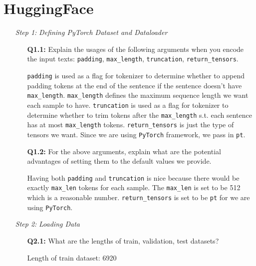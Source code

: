 \documentclass{article}
\newenvironment{solution}{\color{blue}}{}
\begin{document}
\section{HuggingFace}
\begin{itemize}
  \item[\textit{Step 1:}] \textit{Defining PyTorch Dataset and Dataloader}
  
  \begin{itemize}
    \item[\textbf{Q1.1:}] Explain the usages of the following arguments when you encode the input texts: \texttt{padding}, \texttt{max\_length}, \texttt{truncation}, \texttt{return\_tensors}.
    
    \begin{solution}
      \texttt{padding} is used as a flag for tokenizer to determine whether to append padding tokens at the end of the sentence if the sentence doesn't have \texttt{max\_length}. \texttt{max\_length} defines the maximum sequence length we want each sample to have. \texttt{truncation} is used as a flag for tokenizer to determine whether to trim tokens after the \texttt{max\_length} s.t. each sentence has at most \texttt{max\_length} tokens. \texttt{return\_tensors} is just the type of tensors we want. Since we are using \texttt{PyTorch} framework, we pass in \texttt{pt}.
    \end{solution}

    \item[\textbf{Q1.2:}] For the above arguments, explain what are the potential advantages of setting them to the default values we provide.
    
    \begin{solution}
      Having both \texttt{padding} and \texttt{truncation} is nice because there would be exactly \texttt{max\_len} tokens for each sample. The \texttt{max\_len} is set to be 512 which is a reasonable number. \texttt{return\_tensors} is set to be \texttt{pt} for we are using \texttt{PyTorch}.
    \end{solution}
  \end{itemize}
  
  \item[\textit{Step 2:}] \textit{Loading Data}
  
  \begin{itemize}
    \item[\textbf{Q2.1:}] What are the lengths of train, validation, test datasets?
    
    \begin{solution}
      Length of train dataset: 6920
      

\end{solution}
\end{itemize}
\end{itemize}
\end{document}
